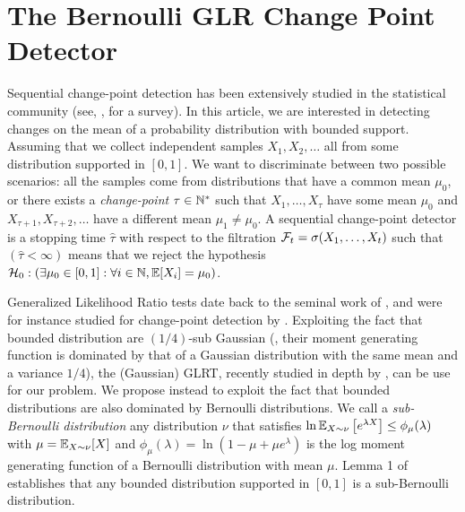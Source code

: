 

\section{The Bernoulli GLR Change Point Detector}
\label{sec:6:ChangePointDetector}

Sequential change-point detection has been extensively studied in the statistical community (see, \eg, \cite{Basseville93} for a survey). In this article, we are interested in detecting changes on the mean of a probability distribution with bounded support. Assuming that  we collect independent samples $X_1,X_2,\ldots$ all from some distribution supported in $[0,1]$. We want to discriminate between two possible scenarios: all the samples come from distributions that have a common mean $\mu_0$, or there exists a \emph{change-point} $\tau \in\mathbb{N}^*$ such that $X_1,\ldots,X_\tau$ have some mean $\mu_0$ and $X_{\tau +1},X_{\tau+2},\ldots$ have a different mean $\mu_1 \neq \mu_0$.
%
A sequential change-point detector is a stopping time $\hat\tau$ with respect to the filtration $\mathcal{F}_t = \sigma(X_1,\dots,X_t)$ such that $(\hat \tau < \infty)$ means that we reject the hypothesis
$\mathcal{H}_0 : \left(\exists \mu_0 \in [0,1]: \forall i\in\mathbb{N}, \mathbb{E}[X_i] = \mu_0\right)$.

Generalized Likelihood Ratio tests date back to the seminal work of \cite{Wilks1938}, and were for instance studied for change-point detection by \cite{barnard1959control,siegmund1995using}. Exploiting the fact that bounded distribution are $(1/4)$-sub Gaussian (\ie, their moment generating function is dominated by that of a Gaussian distribution with the same mean and a variance $1/4$), the (Gaussian) GLRT, recently studied in depth by \cite{Maillard2018GLR}, can be use for our problem. We propose instead to exploit the fact that bounded distributions are also dominated by Bernoulli distributions.
We call a \emph{sub-Bernoulli distribution} any distribution $\nu$ that satisfies
$\ln \mathbb{E}_{X\sim\nu}\left[e^{\lambda X}\right] \leq \phi_{\mu}(\lambda)$ with $\mu=\mathbb{E}_{X\sim \nu}[X]$ and $\phi_{\mu}(\lambda) = \ln(1-\mu + \mu e^\lambda)$ is the log moment generating function of a Bernoulli distribution with mean $\mu$. Lemma 1 of \cite{KLUCBJournal} establishes that any bounded distribution supported in $[0,1]$ is a sub-Bernoulli distribution.


